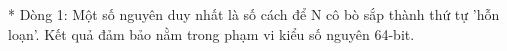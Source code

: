 * Dòng 1: Một số nguyên duy nhất là số cách để N cô bò sắp thành thứ tự 'hỗn loạn'. Kết quả đảm bảo nằm trong phạm vi kiểu số nguyên 64-bit.  

\